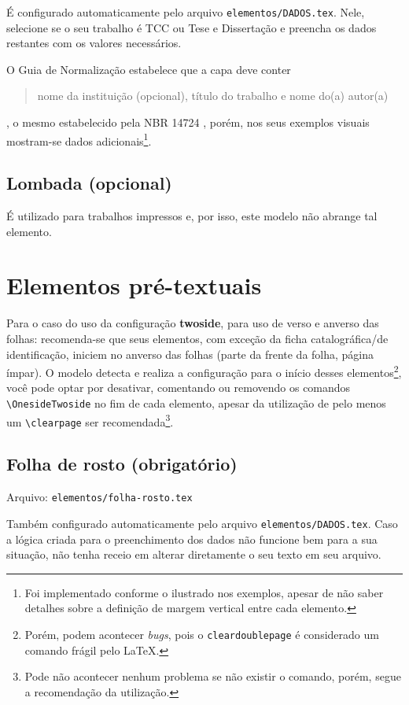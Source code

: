     É configurado automaticamente pelo arquivo \texttt{elementos/DADOS.tex}. Nele, selecione se o seu trabalho é TCC ou Tese e Dissertação e preencha os dados restantes com os valores necessários.

    O Guia de Normalização estabelece que a capa deve conter \blockcquote[p. 30]{livro:iffar-guia-normalizacao-2022}{nome da instituição (opcional), título do trabalho e nome do(a) autor(a)}, o mesmo estabelecido pela NBR 14724 \cite{livro:abnt-nbr-14724:2011}, porém, nos seus exemplos visuais mostram-se dados adicionais\footnote{Foi implementado conforme o ilustrado nos exemplos, apesar de não saber detalhes sobre a definição de margem vertical entre cada elemento.}.

    \subsection{Lombada (opcional)}
    É utilizado para trabalhos impressos e, por isso, este modelo não abrange tal elemento.

\section{Elementos pré-textuais}
    Para o caso do uso da configuração \textbf{twoside}, para uso de verso e anverso das folhas: recomenda-se que seus elementos, com exceção da ficha catalográfica/de identificação, iniciem no anverso das folhas (parte da frente da folha, página ímpar). O modelo detecta e realiza a configuração para o início desses elementos\footnote{Porém, podem acontecer \textit{bugs}, pois o \texttt{cleardoublepage} é considerado um comando frágil pelo \LaTeX{}.}, você pode optar por desativar, comentando ou removendo os comandos \verb|\OnesideTwoside| no fim de cada elemento, apesar da utilização de pelo menos um \verb|\clearpage| ser recomendada\footnote{Pode não acontecer nenhum problema se não existir o comando, porém, segue a recomendação da utilização.}.

\subsection{Folha de rosto (obrigatório)}
    Arquivo: \texttt{elementos/folha-rosto.tex}

    Também configurado automaticamente pelo arquivo \texttt{elementos/DADOS.tex}. Caso a lógica criada para o preenchimento dos dados não funcione bem para a sua situação, não tenha receio em alterar diretamente o seu texto em seu arquivo.

